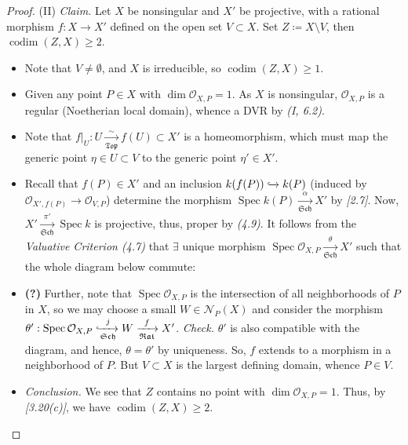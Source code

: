 \documentclass[11pt,a4paper,footinclude=true,headinclude=true]{scrbook} %
\DeclareMathOperator{\Spec}{Spec}
\DeclareMathOperator{\codim}{codim}
\newcommand{\NN}{\mathcal{N}}
\newcommand{\OO}{\mathcal{O}}
\newcommand{\Sch}{\mathfrak{Sch}}
\newcommand{\Top}{\mathfrak{Top}}
\newcommand{\<}{\langle}
\newcommand{\>}{\rangle}
\begin{document}
\begin{proof}
    (II) \textit{Claim.} Let $X$ be nonsingular and $X'$ be projective, with a rational morphism $f:X\to X'$ defined on the open set $V\subset X$. Set $Z\coloneqq X\setminus V$, then $\codim(Z,X)\geq2$.
    \begin{itemize}
        \item Note that $V\neq\emptyset$, and $X$ is irreducible, so $\codim(Z,X)\geq1$.
        \item Given any point $P\in X$ with $\dim\OO_{X,P}=1$. As $X$ is nonsingular, $\OO_{X,P}$ is a regular (Noetherian local domain), whence a DVR by \textit{(I, 6.2)}.
        \item Note that $f|_U:U\xrightarrow[\Top]{\sim}f(U)\subset X'$ is a homeomorphism, which must map the generic point $\eta\in U\subset V$ to the generic point $\eta'\in X'$.
        \item Recall that $f(P)\in X'$ and an inclusion $k(f(P))\xhookrightarrow{}k(P)$ (induced by $\OO_{X',f(P)}\to\OO_{V,P}$) determine the morphism $\Spec k(P)\xrightarrow[\Sch]{\alpha}X'$ by \textit{[2.7]}. Now, $X'\xrightarrow[\Sch]{\pi'}\Spec k$ is projective, thus, proper by \textit{(4.9)}. It follows from the \textit{Valuative Criterion (4.7)} that $\exists$ unique morphism $\Spec\OO_{X,P}\xrightarrow[\Sch]{\theta}X'$ such that the whole diagram below commute:
        \begin{center}
        \end{center}
        \item \textbf{(?)} Further, note that $\Spec\OO_{X,P}$ is the intersection of all neighborhoods of $P$ in $X$, so we may choose a small $W\in\NN_P(X)$ and consider the morphism $\theta':\Spec\OO_{X,P}\xhookrightarrow[\Sch]{j}W\xrightarrow[\mathfrak{Rat}]{f}X'$. \textit{Check.} $\theta'$ is also compatible with the diagram, and hence, $\theta=\theta'$ by uniqueness. So, $f$ extends to a morphism in a neighborhood of $P$. But $V\subset X$ is the largest defining domain, whence $P\in V$.
        \item \textit{Conclusion.} We see that $Z$ contains no point with $\dim\OO_{X,P}=1$. Thus, by \textit{[3.20(c)]}, we have $\codim(Z,X)\geq2$.
    \end{itemize}
    

\end{proof}
\end{document}
